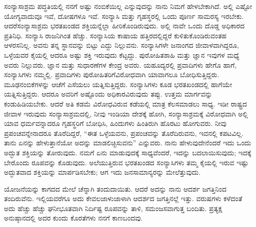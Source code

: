 ಸಂನ್ಯಾಸಾಶ್ರಮ ಪದ್ಧತಿಯಲ್ಲಿ ನನಗೆ ಅಷ್ಟು ನಂಬಿಕೆಯಿಲ್ಲ ಎನ್ನುವುದನ್ನು ನಾನು ನಿಮಗೆ ಹೇಳಬೇಕಾಗಿದೆ. ಅಲ್ಲಿ ಎಷ್ಟೋ ಯೋಗ್ಯವಾದುವೂ ಇವೆ, ದೋಷಗಳೂ ಇವೆ. ಸಂನ್ಯಾಸಿ ಮತ್ತು ಗೃಹಸ್ಥರಲ್ಲಿ ಒಂದು ಪೂರ್ಣ ಸಾಮರಸ್ಯ ಇರಬೇಕು. ಆದರೆ\break ಸಂನ್ಯಾಸಾಶ್ರಮ ಭರತಖಂಡದ ಶಕ್ತಿಯನ್ನೆಲ್ಲಾ ಹೀರಿಕೊಂಡಿರುವುದು. ಅಲ್ಲಿ ನಾವೇ ಒಂದು ದೊಡ್ಡ ಅಧಿಕಾರದ ಪ್ರತಿನಿಧಿ. ಸಂನ್ಯಾಸಿ ರಾಜನಿಗಿಂತ ಹೆಚ್ಚು. ಸಂನ್ಯಾಸಿಯ ಕಾಷಾಯ ಹತ್ತಿರದಲ್ಲಿದ್ದರೆ ಕುಳಿತುಕೊಂಡಿರುವಂತಹ ಆಳರಸನಿಲ್ಲ. ಅವನು ತನ್ನ ಸ್ಥಾನವನ್ನು ಬಿಟ್ಟು ಎದ್ದು ನಿಲ್ಲುವನು. ಸಂನ್ಯಾಸಿಗಳೇ ಜನಾಂಗದ ಜೀವಾಳವಾಗಿದ್ದರೂ, ಒಳ್ಳೆಯವರ ಕೈಯಲ್ಲಿ ಆದರೂ ಅಷ್ಟು ಶಕ್ತಿ ಇರುವುದು ಕೆಟ್ಟದ್ದು. ಪುರೋಹಿತಶಾಹಿ ಮತ್ತು ಜ್ಞಾನ ಇವುಗಳ ಮಧ್ಯೆ ಅವರು ನಿಲ್ಲುವರು. ಜ್ಞಾನ ಮತ್ತು ಸುಧಾರಣೆಗಳ ಕೇಂದ್ರ ಅವರು. ಯಹೂದ್ಯರಲ್ಲಿ ಪ್ರವಾದಿಗಳು ಹೇಗೊ ಹಾಗೆ, ಸಂನ್ಯಾಸಿಗಳು ನಮ್ಮಲ್ಲಿ. ಪ್ರವಾದಿಗಳು ಪುರೋಹಿತರಿಗೆ\break ವಿರೋಧವಾಗಿ ಯಾವಾಗಲೂ ಬೋಧಿಸುತ್ತಿದ್ದರು. ಮೂಢನಂಬಿಕೆಗಳನ್ನು ಆಚೆಗೆ ಎಸೆಯಲು ಯತ್ನಿಸುತ್ತಿದ್ದರು. ಸಂನ್ಯಾಸಿಗಳು ಕೂಡ ಭರತಖಂಡದಲ್ಲಿ ಹಾಗೆಯೇ ಯತ್ನಿಸುತ್ತಿದ್ದರು. ಆದರೂ ಅವರಿಗೆ ಅಷ್ಟೊಂದು ಅಧಿಕಾರವಿರುವುದು ತಪ್ಪು. ಉತ್ತಮ ಮಾರ್ಗವನ್ನು ಕಂಡುಹಿಡಿಯಬೇಕು. ಆದರೆ ಅತಿ ಕಡಮೆ ವಿರೋಧವಿರುವ ಕಡೆಯಲ್ಲಿ ಮಾತ್ರ ಕೆಲಸಮಾಡಲು ಸಾಧ್ಯ. ಇಡೀ ರಾಷ್ಟ್ರದ ಜೀವಾಳ ಇರುವುದು ಸಂನ್ಯಾಸಾಶ್ರಮದಲ್ಲಿ, ನೀವು ಇಂಡಿಯಾ ದೇಶಕ್ಕೆ ಹೋಗಿ, ಸಂನ್ಯಾಸಾಶ್ರಮಕ್ಕೆ ವಿರೋಧವಾಗಿ ಅಲ್ಲಿ ಯಾವ ಧರ್ಮವನ್ನಾದರೂ ಗೃಹಸ್ಥರಿಗೆ ಬೋಧಿಸಿ, ಹಿಂದುಗಳು ಹಿಂತಿರುಗಿ ಹೊರಟು ಹೋಗುವರು. ನೀವು ಪ್ರಪಂಚವನ್ನೇನಾದರೂ ತೊರೆದಿದ್ದರೆ, “ಈತ ಒಳ್ಳೆಯವನು, ಪ್ರಪಂಚವನ್ನು ತೊರೆದಿರುವನು, ಇವನಲ್ಲಿ ಕಪಟವಿಲ್ಲ. ತಾನು ಏನನ್ನು ಹೇಳುತ್ತಾನೆಯೋ ಅದನ್ನು ಮಾಡಲಿಚ್ಛಿಸುವನು” ಎನ್ನುವರು. ನಾನು ಹೇಳುವುದೇನೆಂದರೆ ಇದು ಒಂದು ಅದ್ಭುತ ಶಕ್ತಿಯನ್ನು ತೋರುವುದು. ನಮಗೆ ಏನು ಮಾಡುವುದಕ್ಕೆ ಸಾಧ್ಯವೆಂದರೆ, ಇದನ್ನು ಬದಲಾಯಿಸುವುದು; ಇದಕ್ಕೆ ಬೇರೊಂದು ರೂಪವನ್ನು ಕೊಡುವುದು. ಅಲೆಯುತ್ತಿರುವ ಭರತಖಂಡದ ಸಂನ್ಯಾಸಿಗಳು ತಮ್ಮ ಕೈಯಲ್ಲಿ ಇರುವ ಇಷ್ಟು ಅದ್ಭುತವಾದ ಶಕ್ತಿಯನ್ನು ಮಾರ್ಪಡಿಸಬೇಕು; ಆಗ ಇದು ಜನಸಾಮಾನ್ಯರನ್ನು ಮೇಲೆತ್ತುವುದು.

ಯೋಜನೆಯನ್ನು ಕಾಗದದ ಮೇಲೆ ಚೆನ್ನಾಗಿ ತಂದುದಾಯಿತು. ಆದರೆ ಅದನ್ನು ನಾನು ಆದರ್ಶ ಜಗತ್ತಿನಿಂದ ತಂದಿರುವೆನು. ಇಲ್ಲಿಯವರೆಗೂ ಅದು ಕೇವಲ\break ಜಾಳುಜಾಳಾಗಿ ಆದರ್ಶದ ಜಗತ್ತಿನಲ್ಲೆ ಇತ್ತು. ವರುಷಗಳು ಕಳೆದಂತೆ ಅದು ಹೆಚ್ಚು ಹೆಚ್ಚು ಘನೀಭೂತವಾಗಿ ನಿರ್ದಿಷ್ಟ ರೂಪವನ್ನು ತಾಳಿ, ಸಮಂಜಸವಾಗುತ್ತ ಬಂದಿತು. ಪ್ರತ್ಯಕ್ಷ ಅನುಷ್ಠಾನದಲ್ಲಿ ಅದರ ಕುಂದು ಕೊರತೆಗಳು ನನಗೆ ಕಾಣಬಂದವು.

